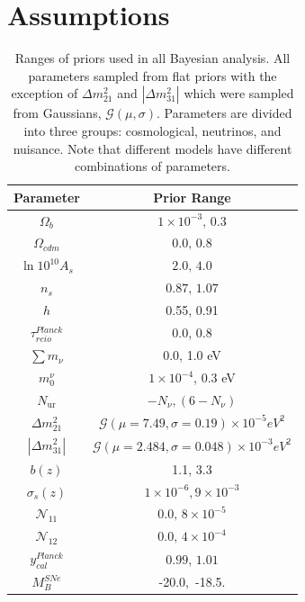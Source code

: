 \section{Assumptions}
\begin{table}
  \centering
  \caption{Ranges of priors used in all Bayesian analysis. All parameters sampled from flat priors with the exception of $\Delta m_{21}^2$ and $|\Delta m_{31}^2|$ which were sampled from Gaussians, $\mathcal{G}(\mu,\sigma)$. Parameters are divided into three groups: cosmological, neutrinos, and nuisance. Note that different models have different combinations of parameters.}
  \label{Tb:PriorsNeutrinos}
  \begin{tabular}{cc}
    \hline
    \hline
    Parameter & Prior Range \\
    \hline
    \hline
     $\Omega_b$ & $1 \times 10^{-3}, \, 0.3$    \\
     $\Omega_{cdm}$ & $0.0, \, 0.8$    \\[0.1cm]
     $\ln 10^{10} A_s$ & $2.0, \, 4.0$    \\
     $n_s$ & $0.87, \, 1.07$    \\
     $h$ & 0.55, 0.91 \\
     $\tau^{Planck}_{reio}$  & 0.0, 0.8 \\
     \hline
     $\sum m_{\nu}$ & 0.0, 1.0 eV\\[0.1cm]
     $m^{\nu}_0$ & $1\times 10^{-4}$, 0.3 eV \\
     $N_{\text{ur}}$ & $-N_{\nu},(6-N_{\nu})$ \\
     $\Delta m_{21}^2$ & $\mathcal{G}(\mu = 7.49, \sigma = 0.19)\times 10^{-5} eV^2$\\
     $|\Delta m_{31}^2|$ & $\mathcal{G}(\mu = 2.484, \sigma = 0.048)\times 10^{-3} eV^2$ \\
     \hline
     $b(z)$  & 1.1, 3.3 \\
     $\sigma_s(z)$ & $1 \times 10^{-6}, 9 \times 10^{-3}$ \\
     $\mathcal{N}_{11}$ & $0.0, \, 8\times 10^{-5}$ \\
     $\mathcal{N}_{12}$ & $0.0, \, 4\times 10^{-4}$ \\
     $y_{cal}^{Planck}$ & $0.99, \, 1.01$ \\
     $M_B^{SNe}$ & -20.0,\, -18.5.\\
     \hline
     \hline
  \end{tabular}
\end{table}
